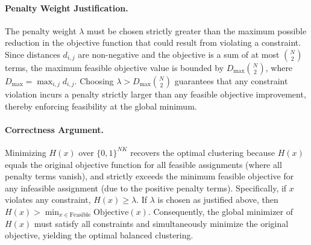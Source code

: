 \documentclass[12pt]{article}
\begin{document}
\paragraph{Penalty Weight Justification.}
The penalty weight $\lambda$ must be chosen strictly greater than the maximum possible reduction in the objective function that could result from violating a constraint. Since distances $d_{i,j}$ are non-negative and the objective is a sum of at most $\binom{N}{2}$ terms, the maximum feasible objective value is bounded by $D_{\max} \binom{N}{2}$, where $D_{\max} = \max_{i,j} d_{i,j}$. Choosing $\lambda > D_{\max} \binom{N}{2}$ guarantees that any constraint violation incurs a penalty strictly larger than any feasible objective improvement, thereby enforcing feasibility at the global minimum.

\paragraph{Correctness Argument.}
Minimizing $H(x)$ over $\{0,1\}^{NK}$ recovers the optimal clustering because $H(x)$ equals the original objective function for all feasible assignments (where all penalty terms vanish), and strictly exceeds the minimum feasible objective for any infeasible assignment (due to the positive penalty terms). Specifically, if $x$ violates any constraint, $H(x) \ge \lambda$. If $\lambda$ is chosen as justified above, then $H(x) > \min_{x \in \text{Feasible}} \text{Objective}(x)$. Consequently, the global minimizer of $H(x)$ must satisfy all constraints and simultaneously minimize the original objective, yielding the optimal balanced clustering.
\end{document}
